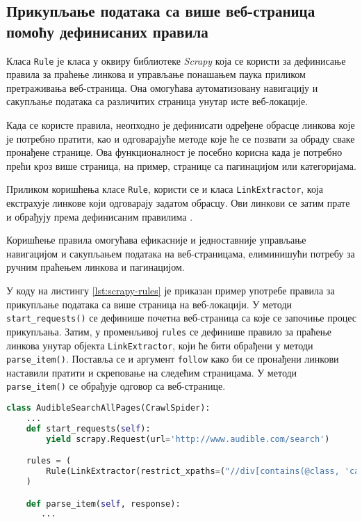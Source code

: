 \documentclass[12pt,oneside]{memoir}
\begin{document}
\subsection{Прикупљање података са више веб-страница помоћу дефинисаних правила}
Класа \texttt{Rule} је класа у оквиру библиотеке \textit{Scrapy} која се користи за дефинисање правила за праћење линкова и управљање понашањем паука приликом претраживања веб-страница. Она омогућава аутоматизовану навигацију и сакупљање података са различитих страница унутар исте веб-локације.

Када се користе правила, неопходно је дефинисати одређене обрасце линкова које је потребно пратити, као и одговарајуће методе које ће се позвати за обраду сваке пронађене странице. Ова функционалност је посебно корисна када је потребно прећи кроз више страница, на пример, странице са пагинацијом или категоријама.

Приликом коришћења класе \texttt{Rule}, користи се и класа \texttt{LinkExtractor}, која екстрахује линкове који одговарају задатом обрасцу. Ови линкови се затим прате и обрађују према дефинисаним правилима \cite{scrapy}.

Коришћење правила омогућава ефикасније и једноставније управљање навигацијом и сакупљањем података на веб-страницама, елиминишући потребу за ручним праћењем линкова и пагинацијом.

У коду на листингу \ref{lst:scrapy-rules} је приказан пример употребе правила за прикупљање података са више страница на веб-локацији. У методи  \texttt{start\_requests()}  се дефинише почетна веб-страница са које се започиње процес прикупљања. Затим, у променљивој \texttt{rules} се дефинише правило за праћење линкова унутар објекта \texttt{LinkExtractor}, који ће бити обрађени у методи \texttt{parse\_item()}. Поставља се и аргумент \texttt{follow} како би се пронађени линкови наставили пратити и скреповање на следећим страницама. У методи \texttt{parse\_item()} се обрађује одговор са веб-странице.
\begin{lstlisting}[language=Python, caption={Прикупљање података са више страница коришћењем правила}, label={lst:scrapy-rules}]
class AudibleSearchAllPages(CrawlSpider):
    ...
    def start_requests(self):
        yield scrapy.Request(url='http://www.audible.com/search')

    rules = (
        Rule(LinkExtractor(restrict_xpaths=("//div[contains(@class, 'categories')]//a")), callback='parse_item', follow=True),
    )

    def parse_item(self, response):
       ...
\end{lstlisting}
\end{document}
